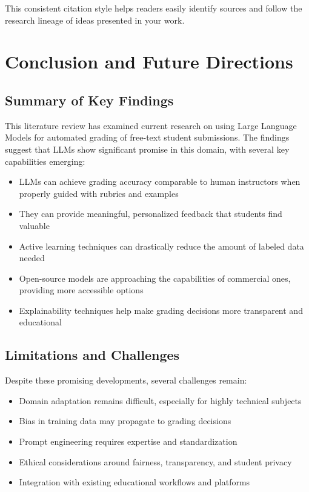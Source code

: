This consistent citation style helps readers easily identify sources and follow the research lineage of ideas presented in your work.

\chapter{Conclusion and Future Directions}

\section{Summary of Key Findings}
This literature review has examined current research on using Large Language Models for automated grading of free-text student submissions. The findings suggest that LLMs show significant promise in this domain, with several key capabilities emerging:

\begin{itemize}
\item LLMs can achieve grading accuracy comparable to human instructors when properly guided with rubrics and examples
\item They can provide meaningful, personalized feedback that students find valuable
\item Active learning techniques can drastically reduce the amount of labeled data needed
\item Open-source models are approaching the capabilities of commercial ones, providing more accessible options
\item Explainability techniques help make grading decisions more transparent and educational
\end{itemize}

\section{Limitations and Challenges}
Despite these promising developments, several challenges remain:

\begin{itemize}
\item Domain adaptation remains difficult, especially for highly technical subjects
\item Bias in training data may propagate to grading decisions
\item Prompt engineering requires expertise and standardization
\item Ethical considerations around fairness, transparency, and student privacy
\item Integration with existing educational workflows and platforms
\end{itemize}

